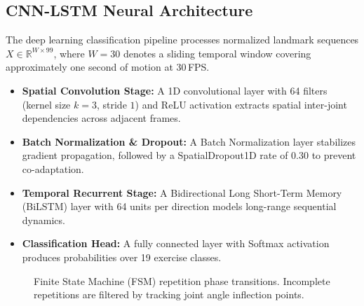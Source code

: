 \documentclass[conference]{IEEEtran}
\begin{document}
\subsection{CNN-LSTM Neural Architecture}
The deep learning classification pipeline processes normalized landmark sequences $X \in \mathbb{R}^{W \times 99}$, where $W = 30$ denotes a sliding temporal window covering approximately one second of motion at 30\,FPS.
\begin{itemize}
    \item \textbf{Spatial Convolution Stage:} A 1D convolutional layer with 64 filters (kernel size $k=3$, stride $1$) and ReLU activation extracts spatial inter-joint dependencies across adjacent frames.
    \item \textbf{Batch Normalization \& Dropout:} A Batch Normalization layer \cite{ioffe2015batch} stabilizes gradient propagation, followed by a SpatialDropout1D rate of $0.30$ \cite{srivastava2014dropout} to prevent co-adaptation.
    \item \textbf{Temporal Recurrent Stage:} A Bidirectional Long Short-Term Memory (BiLSTM) layer with 64 units per direction models long-range sequential dynamics.
    \item \textbf{Classification Head:} A fully connected layer with Softmax activation produces probabilities over 19 exercise classes.
\end{itemize}

\begin{figure}[!b]
\centering
{}
\caption{Finite State Machine (FSM) repetition phase transitions. Incomplete repetitions are filtered by tracking joint angle inflection points.}
\label{fig:fsm}
\end{figure}
\end{document}
